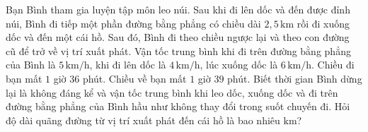 \begin{bt}%
Bạn Bình tham gia luyện tập môn leo núi. Sau khi đi lên dốc và đến được đỉnh núi, Bình đi tiếp một phần đường bằng phẳng có chiều dài $2{,}5\, \mathrm{km}$ rồi đi xuống dốc và đến một cái hồ. Sau đó, Bình đi theo chiều ngược lại và theo con đường cũ để trở về vị trí xuất phát. Vận tốc trung bình khi đi trên đường bằng phẳng của Bình là $5\, \mathrm{km}/\mathrm{h}$, khi đi lên dốc là $4\, \mathrm{km}/\mathrm{h}$, lúc xuống dốc là $6\, \mathrm{km}/\mathrm{h}$. Chiều đi bạn mất $1$ giờ $36$ phút. Chiều về bạn mất $1$ giờ $39$ phút. Biết thời gian Bình dừng lại là không đáng kể và vận tốc trung bình khi leo dốc, xuống dốc và đi trên đường bằng phẳng của Bình hầu như không thay đổi trong suốt chuyến đi. Hỏi độ dài quãng đường từ vị trí xuất phát đến cái hồ là bao nhiêu $\mathrm{km}$?
\end{bt}

